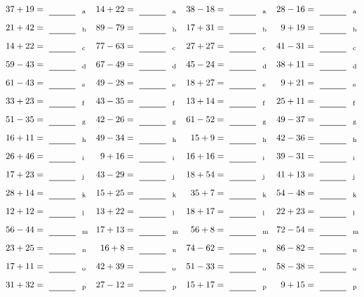 \documentclass
[
  draft    = true,
  fontsize = 11pt,
  parskip  = half-
]
{scrartcl}
\begin{document}
\clearpage
\begin{align*}
    \pline{37+19}&=\rline{a}
  & \pline{14+22}&=\rline{a}
  & \pline{38-18}&=\rline{a}
  & \pline{28-16}&=\rline{a} \\[1ex]
    \pline{21+42}&=\rline{b}
  & \pline{89-79}&=\rline{b}
  & \pline{17+31}&=\rline{b}
  & \pline{9+19}&=\rline{b} \\[1ex]
    \pline{14+22}&=\rline{c}
  & \pline{77-63}&=\rline{c}
  & \pline{27+27}&=\rline{c}
  & \pline{41-31}&=\rline{c} \\[1ex]
    \pline{59-43}&=\rline{d}
  & \pline{67-49}&=\rline{d}
  & \pline{45-24}&=\rline{d}
  & \pline{38+11}&=\rline{d} \\[1ex]
    \pline{61-43}&=\rline{e}
  & \pline{49-28}&=\rline{e}
  & \pline{18+27}&=\rline{e}
  & \pline{9+21}&=\rline{e} \\[1ex]
    \pline{33+23}&=\rline{f}
  & \pline{43-35}&=\rline{f}
  & \pline{13+14}&=\rline{f}
  & \pline{25+11}&=\rline{f} \\[1ex]
    \pline{51-35}&=\rline{g}
  & \pline{42-26}&=\rline{g}
  & \pline{61-52}&=\rline{g}
  & \pline{49-37}&=\rline{g} \\[1ex]
    \pline{16+11}&=\rline{h}
  & \pline{49-34}&=\rline{h}
  & \pline{15+9}&=\rline{h}
  & \pline{42-36}&=\rline{h} \\[1ex]
    \pline{26+46}&=\rline{i}
  & \pline{9+16}&=\rline{i}
  & \pline{16+16}&=\rline{i}
  & \pline{39-31}&=\rline{i} \\[1ex]
    \pline{17+23}&=\rline{j}
  & \pline{43-29}&=\rline{j}
  & \pline{18+54}&=\rline{j}
  & \pline{41+13}&=\rline{j} \\[1ex]
    \pline{28+14}&=\rline{k}
  & \pline{15+25}&=\rline{k}
  & \pline{35+7}&=\rline{k}
  & \pline{54-48}&=\rline{k} \\[1ex]
    \pline{12+12}&=\rline{l}
  & \pline{13+22}&=\rline{l}
  & \pline{18+17}&=\rline{l}
  & \pline{22+23}&=\rline{l} \\[1ex]
    \pline{56-44}&=\rline{m}
  & \pline{17+13}&=\rline{m}
  & \pline{56+8}&=\rline{m}
  & \pline{72-54}&=\rline{m} \\[1ex]
    \pline{23+25}&=\rline{n}
  & \pline{16+8}&=\rline{n}
  & \pline{74-62}&=\rline{n}
  & \pline{86-82}&=\rline{n} \\[1ex]
    \pline{17+11}&=\rline{o}
  & \pline{42+39}&=\rline{o}
  & \pline{51-33}&=\rline{o}
  & \pline{58-38}&=\rline{o} \\[1ex]
    \pline{31+32}&=\rline{p}
  & \pline{27-12}&=\rline{p}
  & \pline{15+17}&=\rline{p}
  & \pline{9+15}&=\rline{p}
\end{align*}
\end{document}
